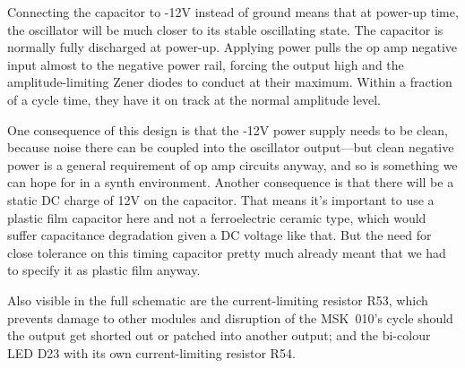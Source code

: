 Connecting the capacitor to -12V instead of ground means that at power-up
time, the oscillator will be much closer to its stable oscillating state. 
The capacitor is normally fully discharged at power-up.  Applying power
pulls the op amp negative input almost to the negative power rail, forcing
the output high and the amplitude-limiting Zener diodes to conduct at their
maximum.  Within a fraction of a cycle time, they have it on track at the
normal amplitude level.

One consequence of this design is that the -12V power supply needs to be
clean, because noise there can be coupled into the oscillator output---but
clean negative power is a general requirement of op amp circuits anyway, and
so is something we can hope for in a synth environment.  Another consequence
is that there will be a static DC charge of 12V on the capacitor.  That
means it's important to use a plastic film capacitor here and not a
ferroelectric ceramic type, which would suffer capacitance
degradation given a DC voltage like that.  But the need for close tolerance
on this timing capacitor pretty much already meant that we had to specify it
as plastic film anyway.

Also visible in the full schematic are the current-limiting resistor R53,
which prevents damage to other modules and disruption of the MSK~010's cycle
should the output get shorted out or patched into another output; and the
bi-colour LED D23 with its own current-limiting resistor R54.
